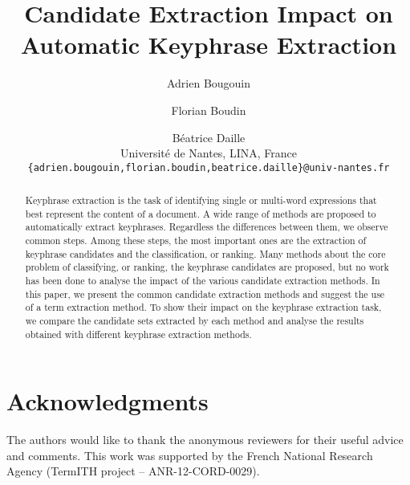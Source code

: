 \documentclass[11pt]{article}
\title{Candidate Extraction Impact on Automatic Keyphrase Extraction}
\author{
  Adrien Bougouin \and Florian Boudin \and Béatrice Daille\\
  Université de Nantes, LINA, France\\
  {\tt \{adrien.bougouin,florian.boudin,beatrice.daille\}@univ-nantes.fr}
}
\date{}
\begin{document}
  \maketitle
  \begin{abstract}
    Keyphrase extraction is the task of identifying single or multi-word
    expressions that best represent the content of a document. A wide range of
    methods are proposed to automatically extract keyphrases. Regardless the
    differences between them, we observe common steps. Among these steps, the
    most important ones are the extraction of keyphrase candidates and the
    classification, or ranking. Many methods about the core problem of
    classifying, or ranking, the keyphrase candidates are proposed, but no work
    has been done to analyse the impact of the various candidate extraction
    methods. In this paper, we present the common candidate
    extraction methods and suggest the use of a term extraction method. To show
    their impact on the keyphrase extraction
    task, we compare the candidate sets extracted by each method and analyse the
    results obtained with different keyphrase extraction methods.
  \end{abstract}

  

  \section*{Acknowledgments}
  The authors would like to thank the anonymous reviewers for their useful
  advice and comments. This work was supported by the French National Research
  Agency (TermITH project -- ANR-12-CORD-0029).

  
  
\end{document}
